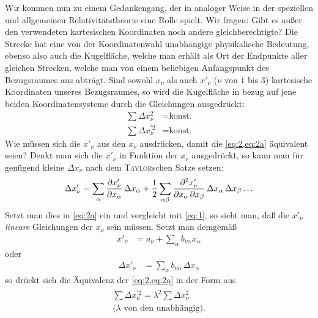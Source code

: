 Wir kommen nun zu einem Gedankengang, der in analoger Weise in der speziellen 
und allgemeinen Relativitätstheorie eine Rolle spielt. Wir fragen: Gibt es 
außer den verwendeten kartesischen Koordinaten noch andere gleichberechtigte? 
Die Strecke hat eine von der Koordinatenwahl unabhängige physikalische 
Bedeutung, ebenso also auch die Kugelfläche, welche man erhält als Ort der 
Endpunkte aller gleichen Strecken, welche man von einem beliebigen 
Anfangspunkt des Bezugsraumes aus abträgt. Sind sowohl $x_\nu$ als auch 
$x'_\nu$ ($\nu$ von $1$ bis $3$) kartesische Koordinaten unseres Bezugsraumes, 
so wird die Kugelfläche in bezug auf jene beiden Koordinatensysteme durch die 
Gleichungen ausgedrückt:
\begin{align}
	\sum \Delta x_{\nu}^{2} &= \text{konst.}
	\label{eq:2} \\
	\sum \Delta x^{\prime 2}_{\nu}&= \text{konst.}
	\label{eq:2a} \tag{2a}
\end{align}
Wie müssen sich die $x'_{\nu}$ aus den $x_{\nu}$ ausdrücken, damit die 
\cref{eq:2,eq:2a} äquivalent seien? Denkt man sich die $x'_{\nu}$ in Funktion 
der $x_{\nu}$ ausgedrückt, so kann man für genügend kleine $\Delta x_{\nu}$ 
nach dem \textsc{Taylor}schen Satze setzen: 
\begin{align*}
\Delta x'_{\nu} = 
	\sum_{\alpha} {\frac{\partial{x'_{\nu}}}{\partial{x_{\alpha}}}}\,\Delta x_{\alpha} +
	\frac{1}{2} \sum_{\alpha\beta}
		{\frac{\partial{^2 x'_{\nu}}}{\partial{x_{\alpha}\,\partial x_{\beta}}}}
			\,\Delta x_{\alpha}\,\Delta x_{\beta} \ldots
\end{align*}
Setzt man dies in \eqref{eq:2a} ein und vergleicht mit \eqref{eq:1}, so sieht
man, daß die $x'_{\nu}$ \emph{lineare} Gleichungen der $x_{\nu}$ sein müssen.
Setzt man demgemäß
\begin{align}
	x'_{\nu} &= a_{\nu} + \sum_\alpha b_{\nu\alpha} x_{\alpha}
	\label{eq:3}
\end{align}
oder
\begin{align}
	\Delta x'_{\nu} &= \sum_\alpha b_{\nu\alpha}\,\Delta x_{\alpha}
	\label{eq:3a} \tag{3a}
\end{align}
so drückt sich die Äquivalenz der \cref{eq:2,eq:2a} in der Form aus
\begin{align}
\begin{aligned}
	\sum \Delta x^{\prime 2}_{\nu} = \lambda^2 \sum \Delta x_{\nu}^2
	\nonumber \\
	\text{($\lambda$ von den unabhängig)}.
\end{aligned}
	\label{eq:2b} \tag{2b}
\end{align}
